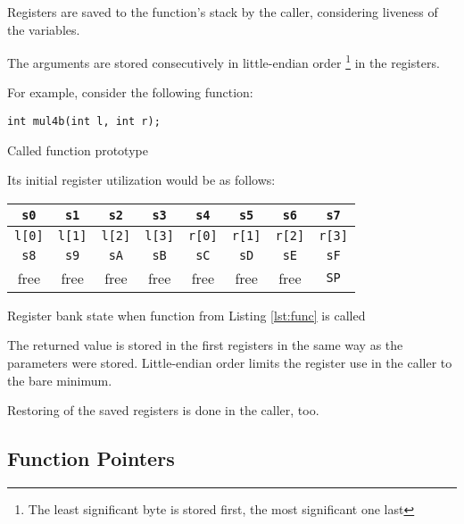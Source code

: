         Registers are saved to the function's stack by the caller, considering liveness of the variables.

        The arguments are stored consecutively in little-endian order \footnote{The least significant byte is stored first, the most significant one last} in the registers.

        For example, consider the following function:

        \begin{listing}
        \centering
        \texttt{int mul4b(int l, int r);}
        \caption{Called function prototype}\label{lst:func}
        \end{listing}

        Its initial register utilization would be as follows:

        \begin{listing}
        \centering
        \begin{tabular}{ | c | c | c | c | c | c | c | c | }
            \hline
            \texttt{s0} & \texttt{s1} & \texttt{s2} & \texttt{s3} & \texttt{s4} & \texttt{s5} & \texttt{s6} & \texttt{s7} \\
            \hline
            \texttt{l[0]} & \texttt{l[1]} & \texttt{l[2]} & \texttt{l[3]} & \texttt{r[0]} & \texttt{r[1]} & \texttt{r[2]} & \texttt{r[3]} \\
            \hline
            \hline
            \texttt{s8} & \texttt{s9} & \texttt{sA} & \texttt{sB} & \texttt{sC} & \texttt{sD} & \texttt{sE} & \texttt{sF} \\
            \hline
            free & free & free & free & free & free & free & \texttt{SP} \\
            \hline
        \end{tabular}
        \caption{Register bank state when function from Listing \ref{lst:func} is called}\label{lst:regs}
        \end{listing}

        The returned value is stored in the first registers in the same way as the parameters were stored. Little-endian order limits the register use in the caller to the bare minimum.

        Restoring of the saved registers is done in the caller, too.

        \subsection{Function Pointers}

